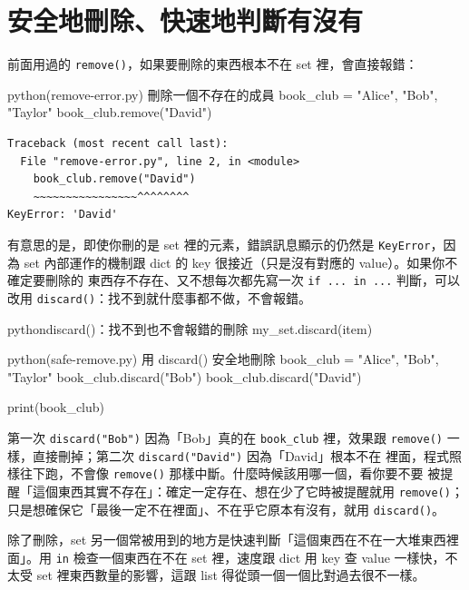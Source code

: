\section{安全地刪除、快速地判斷有沒有}
\label{sec:set-membership}

前面用過的 \texttt{remove()}，如果要刪除的東西根本不在 set 裡，會直接報錯：

\begin{example}{python}{(remove-error.py) 刪除一個不存在的成員}
book_club = {"Alice", "Bob", "Taylor"}
book_club.remove("David")
\end{example}

\begin{verbatim}
Traceback (most recent call last):
  File "remove-error.py", line 2, in <module>
    book_club.remove("David")
    ~~~~~~~~~~~~~~~~^^^^^^^^
KeyError: 'David'
\end{verbatim}

有意思的是，即使你刪的是 set 裡的元素，錯誤訊息顯示的仍然是 \texttt{KeyError}，因為
set 內部運作的機制跟 dict 的 key 很接近（只是沒有對應的 value）。如果你不確定要刪除的
東西存不存在、又不想每次都先寫一次 \texttt{if ... in ...} 判斷，可以改用
\texttt{discard()}：找不到就什麼事都不做，不會報錯。

\begin{code}{python}{discard()：找不到也不會報錯的刪除}
my_set.discard(item)
\end{code}

\begin{example}{python}{(safe-remove.py) 用 discard() 安全地刪除}
book_club = {"Alice", "Bob", "Taylor"}
book_club.discard("Bob")
book_club.discard("David")

print(book_club)
\end{example}


第一次 \texttt{discard("Bob")} 因為「Bob」真的在 \texttt{book\_club} 裡，效果跟
\texttt{remove()} 一樣，直接刪掉；第二次 \texttt{discard("David")} 因為「David」根本不在
裡面，程式照樣往下跑，不會像 \texttt{remove()} 那樣中斷。什麼時候該用哪一個，看你要不要
被提醒「這個東西其實不存在」：確定一定存在、想在少了它時被提醒就用 \texttt{remove()}；
只是想確保它「最後一定不在裡面」、不在乎它原本有沒有，就用 \texttt{discard()}。

除了刪除，set 另一個常被用到的地方是快速判斷「這個東西在不在一大堆東西裡面」。用
\texttt{in} 檢查一個東西在不在 set 裡，速度跟 dict 用 key 查 value 一樣快，不太受 set
裡東西數量的影響，這跟 list 得從頭一個一個比對過去很不一樣。

